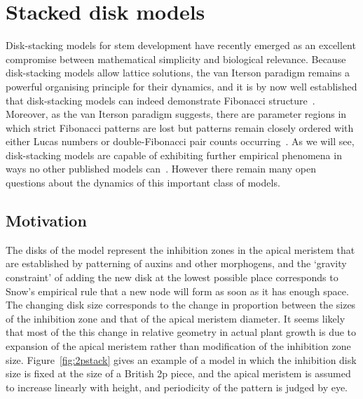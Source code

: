 
\chapter{Stacked disk models}
\label{ch:stackeddisk}

Disk-stacking models for stem development have recently emerged as an excellent compromise between mathematical simplicity and biological relevance. 
Because disk-stacking models allow lattice solutions,  the van Iterson paradigm remains a powerful organising principle for their dynamics, and it is by now well established that disk-stacking models can indeed demonstrate Fibonacci structure~\cite{goleFibonacciQuasisymmetricPhyllotaxis2016}. Moreover, as the van Iterson paradigm suggests, there are parameter regions in which strict Fibonacci patterns are lost but patterns remain closely ordered with either Lucas numbers or double-Fibonacci pair counts occurring~\cite{goleFibonacciQuasisymmetricPhyllotaxis2016,yonekuraMathematicalModelStudies2019}.
As we will see, disk-stacking models are capable of exhibiting further empirical phenomena in ways no other published models can~\cite{swintonDiskstackingModelsAre2024}. However there remain many open questions about the dynamics of this important class of models.


\clearpage
\section{Motivation}
The disks of the model represent the inhibition zones in the apical meristem that are established by patterning of auxins and other morphogens, and the `gravity constraint' of adding the new disk at the lowest possible place corresponds to Snow's empirical rule that a new node will form as soon as it has enough space. The changing disk size corresponds to the change in proportion between the sizes of the inhibition zone and that of the apical meristem diameter. It seems likely that most of the this change in relative geometry in actual plant growth is due to expansion of the apical meristem rather than modification of the inhibition zone size. Figure~\ref{fig:2pstack} gives an example of a model in which the inhibition disk size is fixed at the size of a British 2p piece, and the apical meristem is assumed to increase linearly with height, and periodicity of the pattern is judged by eye. 

